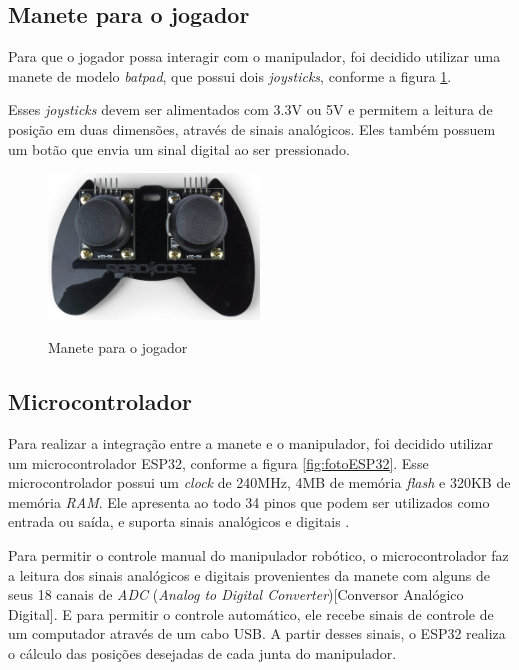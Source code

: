 \subsection[Manete para o jogador]{Manete para o jogador}
\label{sub:maneteJogador}

Para que o jogador possa interagir com o manipulador, foi decidido utilizar uma manete de modelo \textit{batpad}, que possui dois \textit{joysticks}, conforme a figura \ref{fig:fotoManeteJogador}.

Esses \textit{joysticks} devem ser alimentados com 3.3V ou 5V e permitem a leitura de posição em duas dimensões, através de sinais analógicos.
Eles também possuem um botão que envia um sinal digital ao ser pressionado.

\begin{figure}[H]
    \centering
    \caption{Manete para o jogador}
    \includegraphics[keepaspectratio=true, width=0.5\textwidth]
    	{img/foto-controle-jogadores.png}
    \label{fig:fotoManeteJogador}
\end{figure}

\subsection[Microcontrolador]{Microcontrolador}
\label{sub:microcontrolador}

Para realizar a integração entre a manete e o manipulador, foi decidido utilizar um microcontrolador ESP32, conforme a figura \ref{fig:fotoESP32}.
Esse microcontrolador possui um \textit{clock} de 240MHz, 4MB de memória \textit{flash} e 320KB de memória \textit{RAM}.
Ele apresenta ao todo 34 pinos que podem ser utilizados como entrada ou saída, e suporta sinais analógicos e digitais \cite{esp32_datasheet}.

Para permitir o controle manual do manipulador robótico, o microcontrolador faz a leitura dos sinais analógicos e digitais provenientes da manete com alguns de seus 18 canais de \textit{ADC} (\textit{Analog to Digital Converter})[Conversor Analógico Digital].
E para permitir o controle automático, ele recebe sinais de controle de um computador através de um cabo USB.
A partir desses sinais, o ESP32 realiza o cálculo das posições desejadas de cada junta do manipulador.

